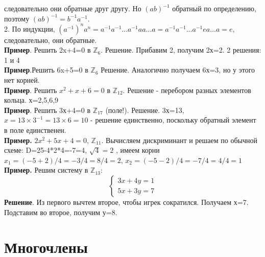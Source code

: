 следовательно они обратные друг другу.
Но $(ab)^{-1}$ обратный по определению, поэтому
$(ab)^{-1}=b^{-1}a^{-1}$.\\
2. По индукции,
$(a^{-1})^na^n=a^{-1}a^{-1}\ldots a^{-1}aa\ldots a=a^{-1}a^{-1}\ldots 
a^{-1}ea\ldots a=e$, 
следовательно, они обратные. 
\\
\textbf{Пример}. Решить 2x+4=0 в $\mathbb Z_6$. Решение. Прибавим 2, 
получим 2х=2. 2 решения: 1 и 4\\
\textbf{Пример}.Решить 6x+5=0 в $\mathbb Z_6$ Решение. Аналогично получаем 6х=3, 
но у этого нет корней.\\
\textbf{Пример}. Решить $x^2+x+6=0$ в $\mathbb Z_{12}$. Решение - перебором 
разных элементов кольца. х=2,5,6,9\\
\textbf{Пример}. Решить 3х+4=0 в $\mathbb Z_{17}$ (поле!). Решение. 
3х=13, $x=13\times 3^{-1}=13\times 6=10$ - решение единственно, поскольку 
обратный элемент в поле единственен. \\
\textbf{Пример.} $2x^2+5x+4=0$, $\mathbb Z_{11}$. Вычисляем дискриминант и
решаем по обычной схеме: D=25-4*2*4=-7=4, $\sqrt{4}=2$
, имеем корни $x_1=(-5+2)/4=-3/4=8/4=2$, $x_2=(-5-2)/4=-7/4=4/4=1$ \\
\textbf{Пример.} Решим систему в $\mathbb Z_{13}$:
$$\begin{cases} 
3x+4y=1\\5x+3y=7
\end{cases}$$ \textbf{Решение}. Из первого вычтем второе, чтобы игрек 
сократился. Получаем х=7. Подставим во второе, получим у=8.\\
\section{Многочлены}
